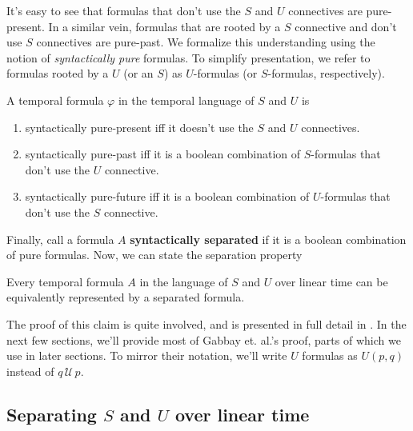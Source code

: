 \documentclass[a4paper,UKenglish,cleveref, autoref, thm-restate, numberwithinsect]{lipics-v2021}
\begin{document}
It's easy to see that formulas that don't use the $S$ and $U$ connectives are pure-present. In a similar vein, formulas that are rooted by a $S$ connective and don't use $S$ connectives are pure-past. We formalize this understanding using the notion of \textit{syntactically pure} formulas. To simplify presentation, we refer to formulas rooted by a $U$ (or an $S$) as $U$-formulas (or $S$-formulas, respectively).
\begin{definition}
    A temporal formula $\varphi$ in the temporal language of $S$ and $U$ is
    \begin{enumerate}
        \item syntactically pure-present iff it doesn't use the $S$ and $U$ connectives.
        \item syntactically pure-past iff it is a boolean combination of $S$-formulas that don't use the $U$ connective.
        \item syntactically pure-future iff it is a boolean combination of $U$-formulas that don't use the $S$ connective.
    \end{enumerate}
\end{definition}

Finally, call a formula $A$ \textbf{syntactically separated} if it is a boolean combination of pure formulas. Now, we can state the separation property
\begin{claim*}
    \label{claim:separation-property-linear-time}
    Every temporal formula $A$ in the language of $S$ and $U$ over linear time can be equivalently represented by a separated formula.
\end{claim*}
The proof of this claim is quite involved, and is presented in full detail in \cite{gabbay1994}. In the next few sections, we'll provide most of Gabbay et. al.'s proof, parts of which we use in later sections. To mirror their notation, we'll write $U$ formulas as $U(p, q)$ instead of $q \,\mathcal{U}\, p$.

\subsection{Separating $S$ and $U$ over linear time}
\end{document}

